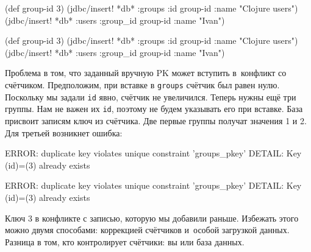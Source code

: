\ifx\DEVICETYPE\MOBILE

\begin{english}
  \begin{clojure}
(def group-id 3)
(jdbc/insert! *db* :groups
  {:id group-id :name "Clojure users"})
(jdbc/insert! *db* :users
  {:group_id group-id :name "Ivan"})
  \end{clojure}
\end{english}

\else

\begin{english}
  \begin{clojure}
(def group-id 3)
(jdbc/insert! *db* :groups {:id group-id :name "Clojure users"})
(jdbc/insert! *db* :users {:group_id group-id :name "Ivan"})
  \end{clojure}
\end{english}

\fi

Проблема в том, что заданный вручную PK может вступить в~конфликт со
счётчиком. Предположим, при вставке в \verb|groups| счётчик был равен
нулю. Поскольку мы задали \verb|id| явно, счётчик не увеличился. Теперь нужны
ещё три группы. Нам не важен их \verb|id|, поэтому не будем указывать его при
вставке. База присвоит записям ключ из счётчика. Две первые группы получат
значения 1 и 2. Для третьей возникнет ошибка:


\ifx\DEVICETYPE\MOBILE

\begin{english}
  \begin{text}
ERROR: duplicate key violates
       unique constraint 'groups_pkey'
DETAIL: Key (id)=(3) already exists
  \end{text}
\end{english}

\else

\begin{english}
  \begin{text}
ERROR: duplicate key violates unique constraint 'groups_pkey'
DETAIL: Key (id)=(3) already exists
  \end{text}
\end{english}

\fi

Ключ 3 в конфликте с записью, которую мы добавили раньше. Избежать этого можно
двумя способами: коррекцией счётчиков и~особой загрузкой данных. Разница в том,
кто контролирует счётчики: вы или база данных.

